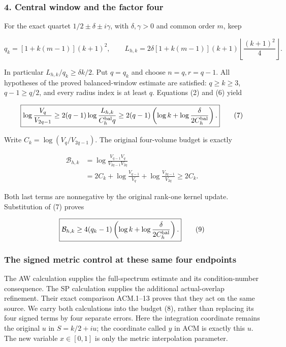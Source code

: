 \subsubsection{4. Central window and the factor four}\label{endpoint-four_volume_threshold--central-window-and-the-factor-four}

For the exact quartet \(1/2\pm\delta\pm i\gamma\), with \(\delta,\gamma>0\) and common order \(m\), keep

\[
q_k=[1+k(m-1)](k+1)^2,\qquad
L_{h,k}=2\delta[1+k(m-1)](k+1)
\left\lfloor\frac{(k+1)^2}{4}\right\rfloor.
\]

In particular \(L_{h,k}/q_k\ge\delta k/2\). Put \(q=q_k\) and choose \(n=q,r=q-1\). All hypotheses of the proved balanced-window estimate are satisfied: \(q\ge k\ge3\), \(q-1\ge q/2\), and every radius index is at least \(q\). Equations (2) and (6) yield

\[
\boxed{\log\frac{V_q}{V_{2q-1}}
\ge2(q-1)\log\frac{L_{h,k}}{C_h^{\rm bal}q}
\ge2(q-1)\left(\log k+\log\frac{\delta}{2C_h^{\rm bal}}\right).}
\tag{7}
\]

Write \(C_k=\log(V_q/V_{2q-1})\). The original four-volume budget is exactly

\[
\begin{aligned}
\mathcal B_{h,k}
&=\log\frac{V_{q-1}V_q}{V_{2q-1}V_{2q}}\\
&=2C_k+\log\frac{V_{q-1}}{V_q}
              +\log\frac{V_{2q-1}}{V_{2q}}\ge2C_k.
\end{aligned}
\tag{8}
\]

Both last terms are nonnegative by the original rank-one kernel update. Substitution of (7) proves

\[
\boxed{\mathcal B_{h,k}\ge
4(q_k-1)\left(\log k+\log\frac{\delta}{2C_h^{\rm bal}}\right).}
\tag{9}
\]


\subsubsection{The signed metric control at these same four endpoints}
\label{endpoint:metric-backprop}
The AW calculation supplies the full-spectrum estimate and its
condition-number consequence. The SP calculation supplies the additional
actual-overlap refinement. Their exact comparison ACM.1--13 proves that
they act on the same source. We carry both calculations into the budget
(8), rather than replacing its four signed terms by four separate errors.
Here the integration coordinate remains the original $u$ in $S=k/2+iu$;
the coordinate called $y$ in ACM is exactly this $u$. The new variable
$x\in[0,1]$ is only the metric interpolation parameter.

